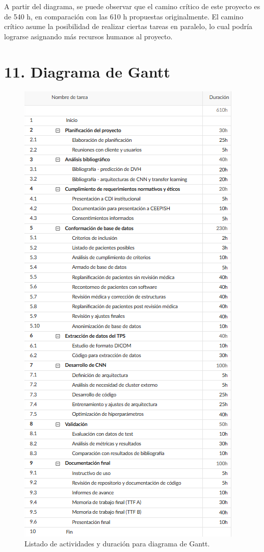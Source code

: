 \documentclass[
11pt, %
codirector, %
]{charter}
\begin{document}
A partir del diagrama, se puede observar que el camino crítico de este proyecto es de 540 h, en comparación con las 610 h propuestas originalmente. El camino crítico asume la posibilidad de realizar ciertas tareas en paralelo, lo cual podría lograrse asignando más recursos humanos al proyecto.
 


\section{11. Diagrama de Gantt}
\label{sec:gantt}

\begin{figure}[htpb]
\centering 
\includegraphics[height=.7\textheight]{./Figuras/Fig4-Gantt.png}
\caption{Listado de actividades y duración para diagrama de Gantt.} %
\label{fig:diagGantt1}
\end{figure}
\end{document}
